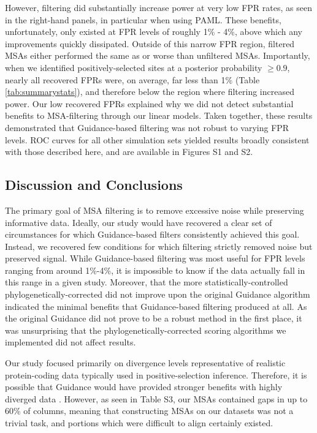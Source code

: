 \documentclass[11pt]{article}
\begin{document}
However, filtering did substantially increase power at very low FPR rates, as seen in the right-hand panels, in particular when using PAML. These benefits, unfortunately, only existed at FPR levels of roughly 1\% - 4\%, above which any improvements quickly dissipated. Outside of this narrow FPR region, filtered MSAs either performed the same as or worse than unfiltered MSAs. Importantly, when we identified positively-selected sites at a posterior probability $\geq 0.9$, nearly all recovered FPRs were, on average, far less than 1\% (Table \ref{tab:summarystats}), and therefore below the region where filtering increased power. Our low recovered FPRs explained why we did not detect substantial benefits to MSA-filtering through our linear models. Taken together, these results demonstrated that Guidance-based filtering was not robust to varying FPR levels. ROC curves for all other simulation sets yielded results broadly consistent with those described here, and are available in Figures S1 and S2.

\subsection*{Discussion and Conclusions}

The primary goal of MSA filtering is to remove excessive noise while preserving informative data. Ideally, our study would have recovered a clear set of circumstances for which Guidance-based filters consistently achieved this goal. Instead, we recovered few conditions for which filtering strictly removed noise but preserved signal. While Guidance-based filtering was most useful for FPR levels ranging from around 1\%-4\%, it is impossible to know if the data actually fall in this range in a given study. Moreover, that the more statistically-controlled phylogenetically-corrected did not improve upon the original Guidance algorithm indicated the minimal benefits that Guidance-based filtering produced at all. As the original Guidance did not prove to be a robust method in the first place, it was unsurprising that the phylogenetically-corrected scoring algorithms we implemented did not affect results.

Our study focused primarily on divergence levels representative of realistic protein-coding data typically used in positive-selection inference. Therefore, it is possible that Guidance would have provided stronger benefits with highly diverged data \citep{Privman2012}. However, as seen in Table S3, our MSAs contained gaps in up to 60\% of columns, meaning that constructing MSAs on our datasets was not a trivial task, and portions which were difficult to align certainly existed.
\end{document}
